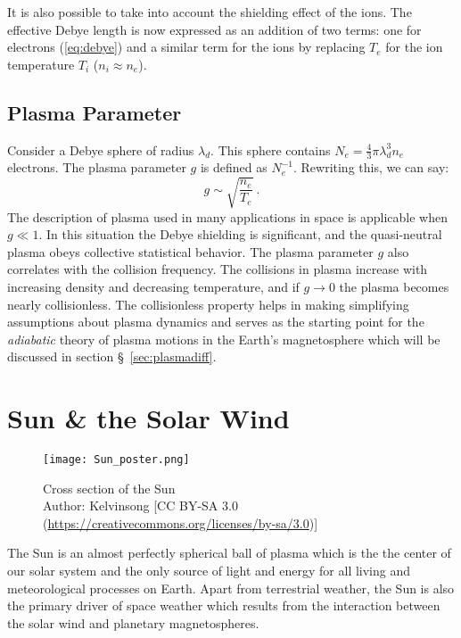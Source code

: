 It is also possible to take into account the shielding effect of the ions. The effective Debye 
length is now expressed as an addition of two terms: one for electrons (\cref{eq:debye}) and a 
similar term for the ions by replacing $T_e$ for the ion temperature $T_i$ ($n_i \approx n_e$). 

\subsection*{Plasma Parameter}

Consider a Debye sphere of radius $\lambda_d$. This sphere contains 
$N_e = \frac{4}{3}\pi \lambda^3_d n_e$ electrons. The plasma parameter $g$ is defined as 
$N_{e}^{-1}$. Rewriting this, we can say:
%
\[
    g \sim \sqrt{\frac{n_e}{T_e}} \ .
\]
%
The description of plasma used in many applications in space is applicable when $g \ll 1$. In 
this situation the Debye shielding is significant, and the quasi-neutral plasma obeys collective 
statistical behavior. The plasma parameter $g$ also correlates with the collision frequency. The 
collisions in plasma increase with increasing density and decreasing temperature, and if 
$g \longrightarrow 0$ the plasma becomes nearly collisionless. The collisionless property helps in 
making simplifying assumptions about plasma dynamics and serves as the starting point for the 
\emph{adiabatic} theory of plasma motions in the Earth's magnetosphere which will be discussed in 
section \S~\ref{sec:plasmadiff}.

\section{Sun \& the Solar Wind}\label{sec:solar}

\begin{figure}
    \noindent\centering\texttt{[image: Sun\_poster.png]}
    \caption{{\small Cross section of the Sun \\ 
    Author: Kelvinsong [CC BY-SA 3.0 (\url{https://creativecommons.org/licenses/by-sa/3.0})]}}
    \label{fig:SunLayers}
\end{figure}

The Sun is an almost perfectly spherical ball of plasma which is the the center of our solar 
system and the only source of light and energy for all living and meteorological processes on 
Earth. Apart from terrestrial weather, the Sun is also the primary driver of space weather which 
results from the interaction between the solar wind and planetary magnetospheres.


